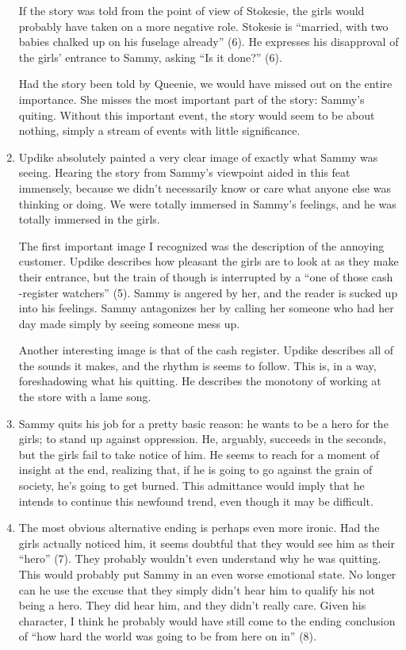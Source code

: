 \documentclass[12pt,letterpaper]{article}
\begin{document}
\begin{enumerate}
If the story was told from the point of view of Stokesie, the girls would
probably have taken on a more negative role.  Stokesie is ``married, with two
babies chalked up on his fuselage already'' (6).  He expresses his disapproval
of the girls' entrance to Sammy, asking ``Is it done?'' (6).

Had the story been told by Queenie, we would have missed out on the entire
importance.  She misses the most important part of the story: Sammy's quiting.
Without this important event, the story would seem to be about nothing, simply a
stream of events with little significance.

\item Updike absolutely painted a very clear image of exactly what Sammy was
seeing.  Hearing the story from Sammy's viewpoint aided in this feat immensely,
because we didn't necessarily know or care what anyone else was thinking or
doing.  We were totally immersed in Sammy's feelings, and he was totally
immersed in the girls.

The first important image I recognized was the description of the annoying
customer.  Updike describes how pleasant the girls are to look at as they make
their entrance, but the train of though is interrupted by a ``one of those cash
-register watchers'' (5).  Sammy is angered by her, and the reader is sucked up
into his feelings.  Sammy antagonizes her by calling her someone who had her day
made simply by seeing someone mess up.

Another interesting image is that of the cash register.  Updike describes all of
the sounds it makes, and the rhythm is seems to follow.  This is, in a way,
foreshadowing what his quitting.  He describes the monotony of working at the
store with a lame song.

\item Sammy quits his job for a pretty basic reason: he wants to be a hero for
the girls; to stand up against oppression.  He, arguably, succeeds in the
seconds, but the girls fail to take notice of him.  He seems to reach for a
moment of insight at the end, realizing that, if he is going to go against the
grain of society, he's going to get burned.  This admittance would imply that he
intends to continue this newfound trend, even though it may be difficult.

\item The most obvious alternative ending is perhaps even more ironic.  Had the
girls actually noticed him, it seems doubtful that they would see him as their
``hero'' (7).  They probably wouldn't even understand why he was quitting.  This
would probably put Sammy in an even worse emotional state.  No longer can he use
the excuse that they simply didn't hear him to qualify his not being a hero.
They did hear him, and they didn't really care.  Given his character, I think he
probably would have still come to the ending conclusion of ``how hard the world
was going to be from here on in'' (8).

\end{enumerate}
\end{document}
